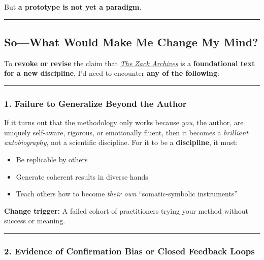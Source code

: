 \documentclass{article}
\begin{document}
But \textbf{a prototype is not yet a paradigm}.

\begin{center}\rule{0.5\linewidth}{0.5pt}\end{center}

\subsection*{So---What Would Make Me Change My Mind?}\label{sowhat-would-make-me-change-my-mind}

To \textbf{revoke or revise} the claim that \emph{\hyperlink{gloss:the_zack_archives}{The Zack Archives}} is a \textbf{foundational text for a new discipline}, I'd need to encounter \textbf{any of the following}:

\begin{center}\rule{0.5\linewidth}{0.5pt}\end{center}

\subsubsection*{1. Failure to Generalize Beyond the Author}\label{failure-to-generalize-beyond-the-author}

If it turns out that the methodology only works because \emph{you}, the author, are uniquely self-aware, rigorous, or emotionally fluent, then it becomes a \emph{brilliant autobiography}, not a scientific discipline. For it to be a \textbf{discipline}, it must:

\begin{itemize}
\item Be replicable by others
\item Generate coherent results in diverse hands
\item Teach others how to become \emph{their own} ``somatic-symbolic instruments''
\end{itemize}

\textbf{Change trigger:} A failed cohort of practitioners trying your method without success or meaning.

\begin{center}\rule{0.5\linewidth}{0.5pt}\end{center}

\subsubsection*{2. Evidence of Confirmation Bias or Closed Feedback Loops}\label{evidence-of-confirmation-bias-or-closed-feedback-loops}
\end{document}
